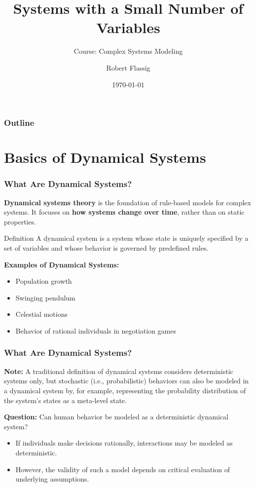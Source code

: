 \documentclass{beamer}
\title{Systems with a Small Number of
Variables}
\subtitle{Course: Complex Systems Modeling}
\author{Robert Flassig}
\institute{Brandenburg University of Applied Sciences}
\date{\today}
\begin{document}
\begin{frame}
\titlepage
\end{frame}

\begin{frame}
\frametitle{Outline}
\tableofcontents
\end{frame}

\section{Basics of Dynamical Systems}

\begin{frame}
    \frametitle{What Are Dynamical Systems?}
    {\small

    \textbf{Dynamical systems theory} is the foundation of rule-based models for complex systems. It focuses on \textbf{how systems change over time}, rather than on static properties.

    \bigskip

     \begin{block}{Definition}
     A dynamical system is a system whose state is uniquely specified by a set of variables and whose behavior is governed by predefined rules.
 \end{block}
    \bigskip

    \textbf{Examples of Dynamical Systems:}
    \begin{itemize}
        \item Population growth
        \item Swinging pendulum
        \item Celestial motions
        \item Behavior of rational individuals in negotiation games
    \end{itemize}

    \bigskip
}
\end{frame}
\begin{frame}
    \frametitle{What Are Dynamical Systems?}
   \textbf{Note:} A traditional definition of dynamical systems considers deterministic systems only, but stochastic (i.e.,
	probabilistic) behaviors can also be modeled in a dynamical system by, for example, representing the probability distribution of the system's states as a meta-level state.

  \bigskip

    \textbf{Question:} Can human behavior be modeled as a deterministic dynamical system?
    \begin{itemize}
        \item If individuals make decisions rationally, interactions may be modeled as deterministic.
        \item However, the validity of such a model depends on critical evaluation of underlying assumptions.
    \end{itemize}
   
\end{frame}
\end{document}
